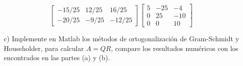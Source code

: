 \begin{enumerate}
\begin{solution}
$$\begin{bmatrix}
                -15/25&12/25&16/25\\
                -20/25&-9/25&-12/25
            \end{bmatrix}\begin{bmatrix}
                5& -25& -4\\
                0& 25& -10\\
                0& 0& 10
            \end{bmatrix}$$
    \end{solution}
    \item[c)] Implemente en Matlab los métodos de ortogonalización de Gram-Schmidt y Householder, para calcular $A = QR$, compare los resultados numéricos con los encontrados en las partes (a) y (b).
\end{enumerate}
